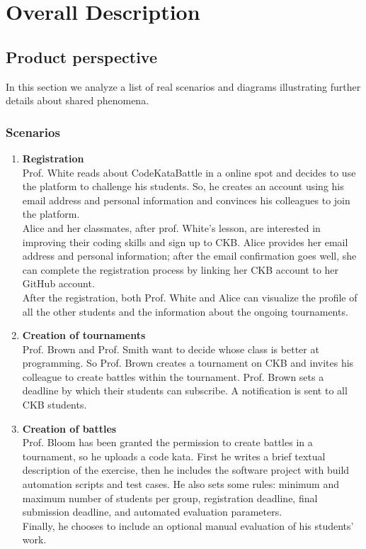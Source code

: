 \chapter{Overall Description}

\section{Product perspective}
In this section we analyze a list of real 
scenarios and diagrams illustrating further details about shared phenomena.

\subsection{Scenarios}
\begin{enumerate}
    \item \textbf{Registration} \\
    Prof. White reads about CodeKataBattle in a online spot and decides to use the platform to 
    challenge his students. So, he creates an account using his email address and personal information 
    and convinces his colleagues to join the platform.\\
    Alice and her classmates, after prof. White's lesson, are interested in improving their coding 
    skills and sign up to CKB. Alice provides her email address and personal information; after the email 
    confirmation goes well, 
    she can complete the registration process by linking her CKB account to her GitHub account.\\
    After the registration, both Prof. White and Alice can visualize the profile of all the other 
    students and the information about the ongoing tournaments.

    \item \textbf{Creation of tournaments} \\
    Prof. Brown and Prof. Smith want to decide whose class is better at programming. So Prof. Brown 
    creates a tournament on CKB and invites his colleague to create battles within the tournament. Prof. Brown 
    sets a deadline by which their students can subscribe. A notification is sent to all CKB students.
    
    \item \textbf{Creation of battles} \\
    Prof. Bloom has been granted the permission to create battles in a tournament, so he uploads a 
    code kata. First he writes a brief textual description of the exercise, then he includes 
    the software project with build automation scripts and test cases. He also sets some rules: 
    minimum and maximum number of students per group, registration deadline, final submission deadline, and
    automated evaluation parameters.\\
    Finally, he chooses to include an optional manual evaluation of his students' work.


\end{enumerate}
